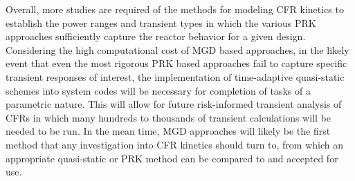 \documentclass[review]{elsarticle}
\begin{document}
\par Overall, more studies are required of the methods for modeling CFR
kinetics to establish the power ranges and transient
types in which the various PRK approaches sufficiently capture the reactor
 behavior for a given design.
Considering the high computational cost of MGD based approaches, in the likely
 event that even the most rigorous PRK based approaches fail
to capture
specific transient responses of interest, the implementation of time-adaptive
quasi-static schemes into system codes will be necessary for completion of tasks
of a parametric nature. This will allow for
 future
risk-informed transient analysis of CFRs in which many hundreds to thousands
of transient calculations will be needed to be run. In the mean time, MGD
approaches will likely be the first method that any investigation into CFR kinetics
should turn to, from which an appropriate quasi-static or PRK method can be
compared to and accepted for use.
\end{document}
